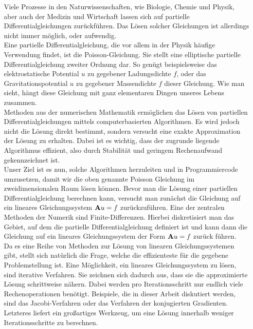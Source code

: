 Viele Prozesse in den Naturwissenschaften, wie Biologie, Chemie und Physik, aber auch der Medizin und Wirtschaft lassen sich auf partielle Differentialgleichungen zurückführen. Das Lösen solcher Gleichungen ist allerdings nicht immer möglich, oder aufwendig. \\
Eine partielle Differentialgleichung, die vor allem in der Physik häufige Verwendung findet, ist die Poisson-Gleichung. Sie stellt eine elliptische partielle Differentialgleichung zweiter Ordnung dar. So genügt beispielsweise das elektrostatische Potential $u$ zu gegebener Ladungsdichte $f$, oder das Gravitationspotential $u$ zu gegebener Massendichte $f$ dieser Gleichung. Wie man sieht, hängt diese Gleichung mit ganz elementaren Dingen unseres Lebens zusammen. \\
Methoden aus der numerischen Mathematik ermöglichen das Lösen von partiellen Differentialgleichungen mittels computerbasierten Algorithmen. Es wird jedoch nicht die Lösung direkt bestimmt, sondern versucht eine exakte Approximation der Lösung zu erhalten. Dabei ist es wichtig, dass der zugrunde liegende Algorithmus effizient, also durch Stabilität und geringem Rechenaufwand gekennzeichnet ist. \\
Unser Ziel ist es nun, solche Algorithmen herzuleiten und in Programmiercode umzusetzen, damit wir die oben genannte Poisson Gleichung im zweidimensionalen Raum lösen können. Bevor man die Lösung einer partiellen Differentialgleichung berechnen kann, versucht man zunächst die Gleichung auf ein lineares Gleichungssystem ${\textbf{A}} u = f$ zurückzuführen. Eine der zentralen Methoden der Numerik sind Finite-Differenzen. Hierbei diskretisiert man das Gebiet, auf dem die partielle Differentialgleichung definiert ist und kann dann die Gleichung auf ein lineares Gleichungssystem der Form ${\textbf{A}} u = f$ zurück führen. \\
Da es eine Reihe von Methoden zur Lösung von linearen Gleichungssystemen gibt, stellt sich natürlich die Frage, welche die effizienteste für die gegebene Problemstellung ist. Eine Möglichkeit, ein lineares Gleichungssystem zu lösen, sind iterative Verfahren. Sie zeichnen sich dadurch aus, dass sie die approximierte Lösung schrittweise nähern. Dabei werden pro Iterationsschritt nur endlich viele Rechenoperationen benötigt. Beispiele, die in dieser Arbeit diskutiert werden, sind das Jacobi-Verfahren oder das Verfahren der konjugierten Gradienten. Letzteres liefert ein großartiges Werkzeug, um eine Lösung innerhalb weniger Iterationsschritte zu berechnen. \\

